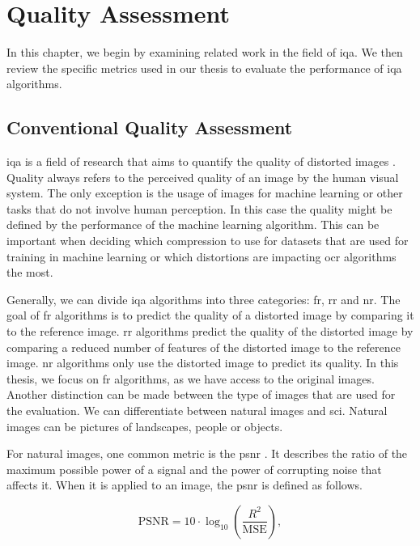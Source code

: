 \chapter{Quality Assessment}
\label{chap:qualityassessment}

In this chapter, we begin by examining related work in the field of \gls{iqa}.
We then review the specific metrics used in our thesis to evaluate the performance of \gls{iqa} algorithms.

\section{Conventional Quality Assessment}

\Gls{iqa} is a field of research that aims to quantify the quality of distorted images \cite{iqa_survey_2020}.
Quality always refers to the perceived quality of an image by the human visual system.
The only exception is the usage of images for machine learning or other tasks that do not involve human perception.
In this case the quality might be defined by the performance of the machine learning algorithm.
This can be important when deciding which compression to use for datasets that are used for training in machine learning or which distortions are impacting \gls{ocr} algorithms the most.

Generally, we can divide \gls{iqa} algorithms into three categories: \gls{fr}, \gls{rr} and \gls{nr}.
The goal of \gls{fr} algorithms is to predict the quality of a distorted image by comparing it to the reference image.
\Gls{rr} algorithms predict the quality of the distorted image by comparing a reduced number of features of the distorted image to the reference image.
\Gls{nr} algorithms only use the distorted image to predict its quality.
In this thesis, we focus on \gls{fr} algorithms, as we have access to the original images.
Another distinction can be made between the type of images that are used for the evaluation.
We can differentiate between natural images and \gls{sci}.
Natural images can be pictures of landscapes, people or objects.

For natural images, one common metric is the \gls{psnr} \cite{PSNRvsSSIM_2010}.
It describes the ratio of the maximum possible power of a signal and the power of corrupting noise that affects it.
When it is applied to an image, the \gls{psnr} is defined as follows.

\begin{equation}
    \text{PSNR} = 10 \cdot \log_{10} \left( \frac{R^2}{\text{MSE}} \right),
    \label{eq:psnr}
\end{equation}

